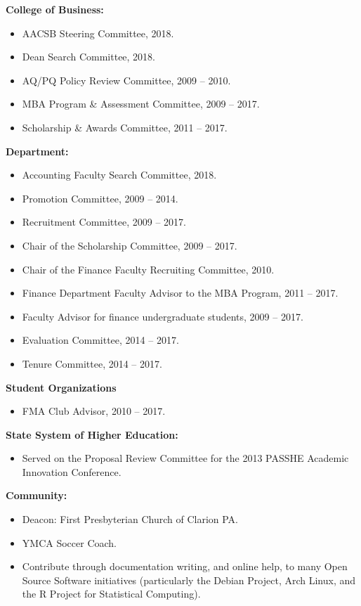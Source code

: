 \documentclass[9pt]{article}
\begin{document}
{\bf College of Business:}
\begin{itemize}[noitemsep, nolistsep]
\item AACSB Steering Committee, 2018.
\item Dean Search Committee, 2018.
\item AQ/PQ Policy Review Committee, 2009 -- 2010.
\item MBA Program \& Assessment Committee, 2009 -- 2017.
\item Scholarship \& Awards Committee, 2011 -- 2017.
\end{itemize}
{\bf Department:}
\begin{itemize}[noitemsep, nolistsep]
\item Accounting Faculty Search Committee, 2018.
\item Promotion Committee, 2009 -- 2014.
\item Recruitment Committee, 2009 -- 2017.
\item Chair of the Scholarship Committee, 2009 -- 2017.
\item Chair of the Finance Faculty Recruiting Committee, 2010.
\item Finance Department Faculty Advisor to the MBA Program, 2011 -- 2017.
\item Faculty Advisor for finance undergraduate students, 2009 -- 2017.
\item Evaluation Committee, 2014 -- 2017.
\item Tenure Committee, 2014 -- 2017.
\end{itemize}
{\bf Student Organizations}
\begin{itemize}[noitemsep, nolistsep]
\item FMA Club Advisor, 2010 -- 2017.
\end{itemize}
{\bf State System of Higher Education:}
\begin{itemize}[noitemsep, nolistsep]
\item Served on the Proposal Review Committee for the 2013 PASSHE Academic Innovation Conference.
\end{itemize}
{\bf Community:}
\begin{itemize}[noitemsep, nolistsep]
\item Deacon: First Presbyterian Church of Clarion PA.
\item YMCA Soccer Coach.
\item Contribute through documentation writing, and online help, to many Open Source Software initiatives (particularly the Debian Project, Arch Linux, and the R Project for Statistical Computing).
\end{itemize}
\end{document}

